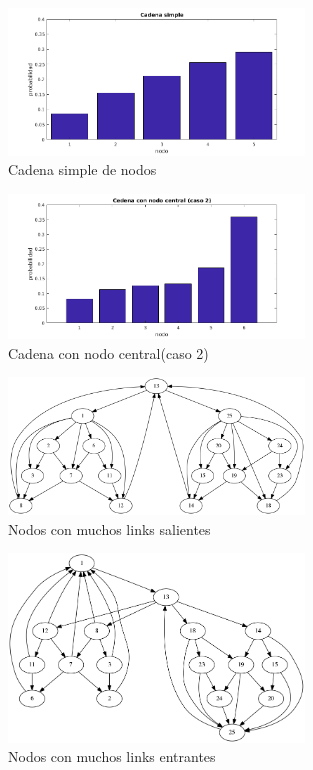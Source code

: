 \begin{figure}[H]
	\centering
	\includegraphics[width=0.7\textwidth]{img/barrascadena4.png}
	\caption{Cadena simple de nodos}
	\label{fig:Ranking cadena simple}
\end{figure}


\begin{figure}[H]
	\centering
	\includegraphics[width=0.7\textwidth]{img/cadena6v2.png}
	\caption{Cadena con nodo central(caso 2)}
	\label{fig:Ranking cadena con nodo central}
\end{figure}


\begin{figure}[H]
	\centering
	\includegraphics[width=0.7\textwidth]{img/links_salientes_25.png}
	\caption{Nodos con muchos links salientes}
	\label{fig:Ranking nodos con muchos links salientes}
\end{figure}



\begin{figure}[H]
	\centering
	\includegraphics[width=0.7\textwidth]{img/links_entrantes_25.png}
	\caption{Nodos con muchos links entrantes}
	\label{fig:Ranking nodos con muchos links entrantes}
\end{figure}
